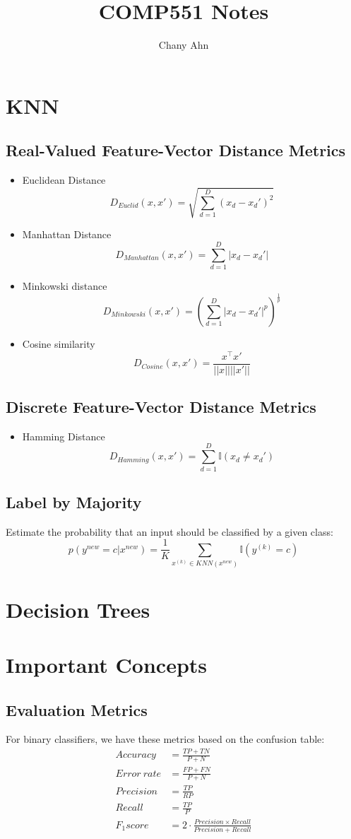 \documentclass{article}
\title{COMP551 Notes}
\author{Chany Ahn}
\date{}
\begin{document}
\maketitle

\section{KNN}
\subsection{Real-Valued Feature-Vector Distance Metrics}
\begin{itemize}
    \item Euclidean Distance
    \[D_{Euclid}(x,x') = \sqrt{\sum_{d=1}^D(x_d - x_d')^2}\]
    \item Manhattan Distance
    \[D_{Manhattan}(x, x') = \sum_{d=1}^D|x_d - x_d'|\]
    \item Minkowski distance
    \[D_{Minkowski}(x,x') = \left(\sum_{d=1}^D|x_d - x_d'|^p\right)^{\frac{1}{p}}\]
    \item Cosine similarity
    \[D_{Cosine}(x,x') = \frac{x^\top x'}{||x||||x'||}\]
\end{itemize}
\subsection{Discrete Feature-Vector Distance Metrics}
\begin{itemize}
    \item Hamming Distance
    \[D_{Hamming}(x,x') = \sum_{d=1}^D \mathbb{I}(x_d \ne x_d')\]
\end{itemize}
\subsection{Label by Majority}
Estimate the probability that an input should be classified by a given class:
\[p(y^{new} = c | x^{new}) = \frac{1}{K}\sum_{x^{(k)} \in KNN(x^{new})}\mathbb{I}(y^{(k)} = c)\]
\section{Decision Trees}
\section{Important Concepts}
\subsection{Evaluation Metrics}
For binary classifiers, we have these metrics based on the confusion table:
\begin{align}
    Accuracy  &= \frac{TP + TN}{P + N}\\
    Error\ rate &= \frac{FP + FN}{P + N}\\
    Precision &= \frac{TP}{RP}\\
    Recall &= \frac{TP}{P}\\
    F_1score &= 2 \cdot \frac{Precision \times Recall}{Precision + Recall}
\end{align}
\end{document}
